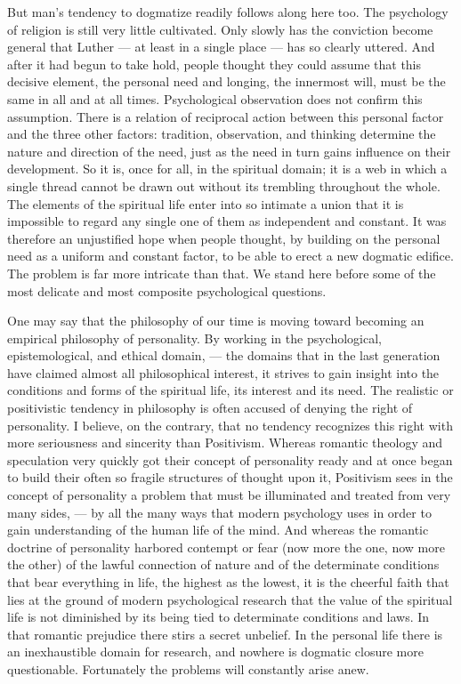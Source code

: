 \documentclass[12pt,a4paper,openany]{book}
\newcommand{\opage}[1]{\marginnote{\footnotesize\textit{[#1]}}}
\begin{document}
But man's tendency to dogmatize readily follows along here too.
The psychology of religion is still very little
cultivated. Only slowly has the conviction become
general that Luther --- at least in a single place --- has so clearly
uttered. And after it had begun to take hold, people thought
they could assume that this decisive element, the
personal need and longing, the innermost will, must be the
same in all and at all times. Psychological observation
does not confirm this assumption. There is a
relation of reciprocal action between this personal factor and the three other
factors: tradition, observation, and thinking determine
the nature and direction of the need, just as the need in turn
gains influence on their development. So it is, once for all,
in the spiritual domain; it is a web in which a
single thread cannot be drawn out without its trembling throughout
the whole. The elements of the spiritual life enter into so intimate
a union that it is impossible to regard any single one of them
as independent and constant. It was therefore an unjustified
hope when people thought, by building on the personal
need as a uniform and constant factor, to be able to erect
a new dogmatic edifice. The problem is far more intricate
than that. We stand here before some of the most delicate and most
composite psychological questions.

One may say that the philosophy of our time is moving
toward becoming an empirical philosophy of personality. By
working in the psychological, epistemological, and ethical
domain, --- the domains that in the last generation
have claimed almost all philosophical interest, it strives
to gain insight into the conditions and forms of the spiritual life,
its interest and its need. The realistic or positivistic
tendency in philosophy is often accused of
denying the right of personality. I believe, on the contrary, that no
tendency recognizes this right with more seriousness and
sincerity than Positivism. Whereas romantic theology and
speculation very quickly got their concept of personality ready
and at once began to build their often so fragile structures
\opage{223}of thought upon it, Positivism sees in the concept of personality a
problem that must be illuminated and treated from very many sides, ---
by all the many ways that modern psychology uses in order to
gain understanding of the human life of the mind. And whereas
the romantic doctrine of personality harbored contempt or fear
(now more the one, now more the other) of the lawful
connection of nature and of the determinate conditions that bear
everything in life, the highest as the lowest, it is the cheerful
faith that lies at the ground of modern psychological research
that the value of the spiritual life is not diminished by its being tied
to determinate conditions and laws. In that romantic prejudice
there stirs a secret unbelief. In the personal life there
is an inexhaustible domain for research, and nowhere is
dogmatic closure more questionable. Fortunately the problems
will constantly arise anew.
\end{document}
